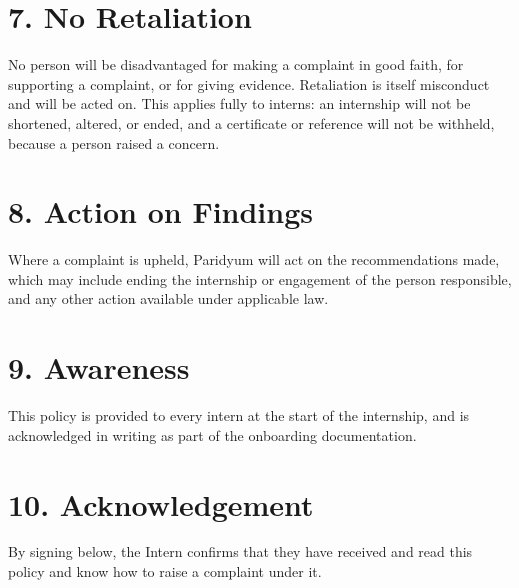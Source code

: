 \documentclass{paridyum}
\begin{document}
\section*{7. No Retaliation}
No person will be disadvantaged for making a complaint in good faith, for supporting a
complaint, or for giving evidence. Retaliation is itself misconduct and will be acted
on. This applies fully to interns: an internship will not be shortened, altered, or
ended, and a certificate or reference will not be withheld, because a person raised a
concern.

\section*{8. Action on Findings}
Where a complaint is upheld, Paridyum will act on the recommendations made, which may
include ending the internship or engagement of the person responsible, and any other
action available under applicable law.

\section*{9. Awareness}
This policy is provided to every intern at the start of the internship, and is
acknowledged in writing as part of the onboarding documentation.

\section*{10. Acknowledgement}
By signing below, the Intern confirms that they have received and read this policy and
know how to raise a complaint under it.

\vspace{1.5em}
\paridyumofficers{\dkSigCeoName}{\dkSigCeoDesignation}{\dkSigCtoName}{\dkSigCtoDesignation}

\vspace{1.5em}
\end{document}
